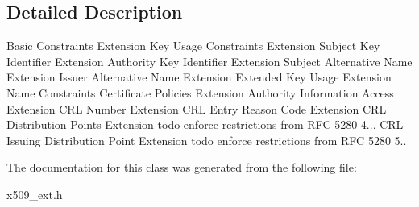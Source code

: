\subsection{Detailed Description}
Basic Constraints Extension Key Usage Constraints Extension Subject Key Identifier Extension Authority Key Identifier Extension Subject Alternative Name Extension Issuer Alternative Name Extension Extended Key Usage Extension Name Constraints Certificate Policies Extension Authority Information Access Extension C\+RL Number Extension C\+RL Entry Reason Code Extension C\+RL Distribution Points Extension todo enforce restrictions from R\+FC 5280 4... C\+RL Issuing Distribution Point Extension todo enforce restrictions from R\+FC 5280 5.. 

The documentation for this class was generated from the following file\+:\begin{DoxyCompactItemize}
\item 
x509\+\_\+ext.\+h\end{DoxyCompactItemize}
